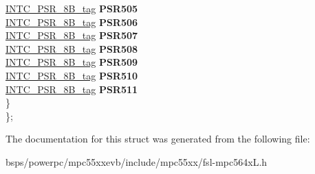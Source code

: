 \begin{DoxyCompactItemize}
\begin{tabbing}
\>\>\mbox{\hyperlink{unionINTC__PSR__8B__tag}{INTC\_PSR\_8B\_tag}} {\bfseries PSR505}\\
\>\>\mbox{\hyperlink{unionINTC__PSR__8B__tag}{INTC\_PSR\_8B\_tag}} {\bfseries PSR506}\\
\>\>\mbox{\hyperlink{unionINTC__PSR__8B__tag}{INTC\_PSR\_8B\_tag}} {\bfseries PSR507}\\
\>\>\mbox{\hyperlink{unionINTC__PSR__8B__tag}{INTC\_PSR\_8B\_tag}} {\bfseries PSR508}\\
\>\>\mbox{\hyperlink{unionINTC__PSR__8B__tag}{INTC\_PSR\_8B\_tag}} {\bfseries PSR509}\\
\>\>\mbox{\hyperlink{unionINTC__PSR__8B__tag}{INTC\_PSR\_8B\_tag}} {\bfseries PSR510}\\
\>\>\mbox{\hyperlink{unionINTC__PSR__8B__tag}{INTC\_PSR\_8B\_tag}} {\bfseries PSR511}\\
\>\} \\
\}; \\

\end{tabbing}\end{DoxyCompactItemize}


The documentation for this struct was generated from the following file\+:\begin{DoxyCompactItemize}
\item 
bsps/powerpc/mpc55xxevb/include/mpc55xx/fsl-\/mpc564x\+L.\+h\end{DoxyCompactItemize}
